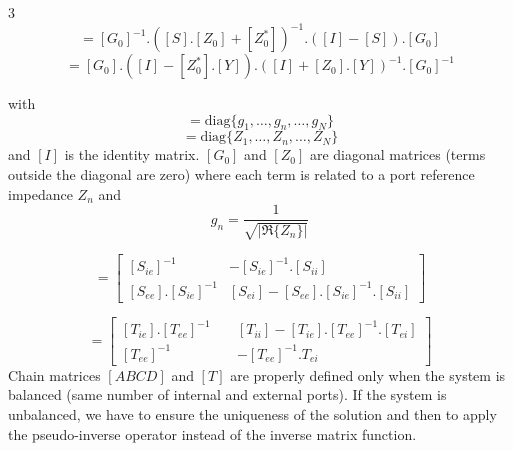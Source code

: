 \documentclass[final]{beamer}
\begin{document}
\begin{frame}[t]
\begin{multicols}{3}
      \begin{equation*}
         [Y]={[G_0]}^{-1}.{([S].[Z_0]+[Z^*_0])}^{-1}.{([I]-[S])}.[G_0]
      \end{equation*}
      \begin{equation*}
         [S]=[G_0].([I]-[Z^*_0].[Y]).{([I]+[Z_0].[Y])}^{-1}.[G_0]^{-1}
      \end{equation*}

      with
      \begin{equation*}
         [G_0]=\text{diag} \{g_1,\dots,g_n,\dots, g_N\}
         \label{G0}
      \end{equation*}
      \begin{equation*}
         [Z_0] =\text{diag}\{Z_1,\dots,Z_n,\dots, Z_N\}
         \label{ref_impedance}
      \end{equation*}
      and $[I]$ is the identity matrix.
      $[G_0]$ and $[Z_0]$ are diagonal matrices (terms outside the diagonal are zero) where each term is related to a port reference impedance $Z_n$ and
      \begin{equation*}
         g_n=\frac{1}{\sqrt{|\Re\{Z_n\}|}}
      \end{equation*}


      \vspace{1cm}
      \begin{equation*}
         [T]=
         \begin{bmatrix}
            {[S_{ie}]}^{-1}          & -{[S_{ie}]}^{-1}.[S_{ii}]                  \\
            [S_{ee}].{[S_{ie}]}^{-1} & [S_{ei}]-[S_{ee}].{[S_{ie}]}^{-1}.[S_{ii}]
         \end{bmatrix}
      \end{equation*}

      \begin{equation*}
         [S]=
         \begin{bmatrix}
            [T_{ie}].{[T_{ee}]}^{-1} & \; & [T_{ii}]-[T_{ie}].{[T_{ee}]}^{-1}.[T_{ei}] \\
            {[T_{ee}]}^{-1}          & \; & -{[T_{ee}]}^{-1}.T_{ei}
         \end{bmatrix}
      \end{equation*}
      Chain matrices $[ABCD]$ and $[T]$ are properly defined only when the system is balanced (same number of internal and external ports). If the system is unbalanced, we have to ensure the uniqueness of the solution and then to apply the pseudo-inverse operator instead of the inverse matrix function.






\end{multicols}
\end{frame}
\end{document}
